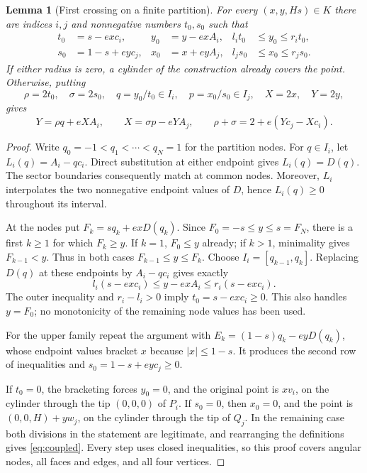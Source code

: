 \documentclass[11pt]{amsart}
\newtheorem{lemma}[theorem]{Lemma}
\theoremstyle{definition}
\theoremstyle{remark}
\begin{document}
\begin{lemma}[First crossing on a finite partition]\label{lem:crossing}
For every $(x,y,Hs)\in K$ there are indices $i,j$ and nonnegative
numbers $t_0,s_0$ such that
\begin{align*}
 t_0&=s-exc_i,& y_0&=y-exA_i,& l_it_0&\le y_0\le r_it_0,\\
 s_0&=1-s+eyc_j,& x_0&=x+eyA_j,& l_js_0&\le x_0\le r_js_0.
\end{align*}
If either radius is zero, a cylinder of the construction already covers
the point. Otherwise, putting
\[
 \rho=2t_0,\quad \sigma=2s_0,\quad q=y_0/t_0\in I_i,
 \quad p=x_0/s_0\in I_j,\quad X=2x,\quad Y=2y,
\]
gives
\begin{equation}\label{eq:coupled}
 Y=\rho q+eXA_i,\qquad X=\sigma p-eYA_j,
 \qquad \rho+\sigma=2+e(Yc_j-Xc_i).
\end{equation}
\end{lemma}
\begin{proof}
Write $q_0=-1<q_1<\cdots<q_N=1$ for the partition nodes. For
$q\in I_i$, let $L_i(q)=A_i-qc_i$. Direct substitution at either
endpoint gives $L_i(q)=D(q)$. The sector boundaries consequently match
at common nodes. Moreover, $L_i$ interpolates the two nonnegative endpoint
values of $D$, hence $L_i(q)\ge0$ throughout its interval.

At the nodes put $F_k=sq_k+exD(q_k)$. Since
$F_0=-s\le y\le s=F_N$, there is a first $k\ge1$ for which
$F_k\ge y$. If $k=1$, $F_0\le y$ already; if $k>1$, minimality
gives $F_{k-1}<y$. Thus in both cases
$F_{k-1}\le y\le F_k$. Choose $I_i=[q_{k-1},q_k]$. Replacing
$D(q)$ at these endpoints by $A_i-qc_i$ gives exactly
\[
 l_i(s-exc_i)\le y-exA_i\le r_i(s-exc_i).
\]
The outer inequality and $r_i-l_i>0$ imply $t_0=s-exc_i\ge0$.
This also handles $y=F_0$; no monotonicity of the remaining node values
has been used.

For the upper family repeat the argument with
$E_k=(1-s)q_k-eyD(q_k)$, whose endpoint values bracket $x$ because
$|x|\le1-s$. It produces the second row of inequalities and
$s_0=1-s+eyc_j\ge0$.

If $t_0=0$, the bracketing forces $y_0=0$, and the original point is
$xv_i$, on the cylinder through the tip $(0,0,0)$ of $P_i$. If
$s_0=0$, then $x_0=0$, and the point is
$(0,0,H)+yw_j$, on the cylinder through the tip of $Q_j$. In the
remaining case both divisions in the statement are legitimate, and
rearranging the definitions gives \eqref{eq:coupled}.
Every step uses closed inequalities, so this proof covers angular nodes,
all faces and edges, and all four vertices.
\end{proof}
\end{document}

